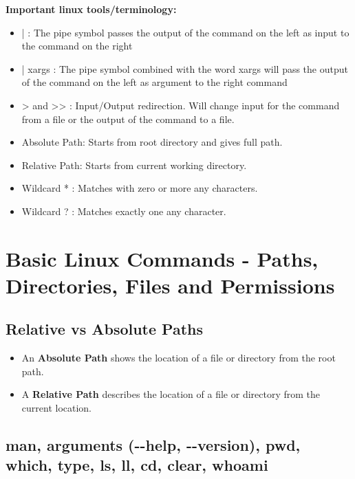 \documentclass{article}
\begin{document}
\noindent\textbf{Important linux tools/terminology:}
\begin{itemize}
	\item | : The pipe symbol passes the output of the command on the left as input to the command on the right
	\item | xargs : The pipe symbol combined with the word xargs will pass the output of the command on the left as argument to the right command
	\item > and >{}> : Input/Output redirection. Will change input for the command from a file or the output of the command to a file.
	\item Absolute Path: Starts from root directory and gives full path.
	\item Relative Path: Starts from current working directory.
	\item Wildcard * : Matches with zero or more any characters.
	\item Wildcard ? : Matches exactly one any character.
\end{itemize}
\newpage


\section{Basic Linux Commands - Paths, Directories, Files and Permissions}

\subsection{Relative vs Absolute Paths}
\begin{itemize}
	\item An \textbf{Absolute Path} shows the location of a file or directory from the root path.
	\item  A \textbf{Relative Path} describes the location of a file or directory from the current location.
\end{itemize}

\subsection{man, arguments (-{}-help, -{}-version), pwd, which, type, ls, ll, cd, clear, whoami}
\end{document}
